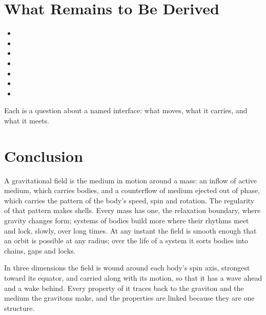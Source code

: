 \documentclass[11pt,a4paper]{article}
\begin{document}
\section{What Remains to Be Derived}
\label{sec:owed}

\begin{itemize}
\item {}
\item {}
\item {}
\item {}
\item {}
\item {}
\item {}
\end{itemize}
Each is a question about a named interface: what moves, what it carries, and what it meets.

\section*{Conclusion}

A gravitational field is the medium in motion around a mass: an inflow of active medium, which carries bodies, and a counterflow of medium ejected out of phase, which carries the pattern of the body's speed, spin and rotation. The regularity of that pattern makes shells. Every mass has one, the relaxation boundary, where gravity changes form; systems of bodies build more where their rhythms meet and lock, slowly, over long times. At any instant the field is smooth enough that an orbit is possible at any radius; over the life of a system it sorts bodies into chains, gaps and locks.

In three dimensions the field is wound around each body's spin axis, strongest toward its equator, and carried along with its motion, so that it has a wave ahead and a wake behind. Every property of it traces back to the graviton and the medium the gravitons make, and the properties are linked because they are one structure.
\end{document}

